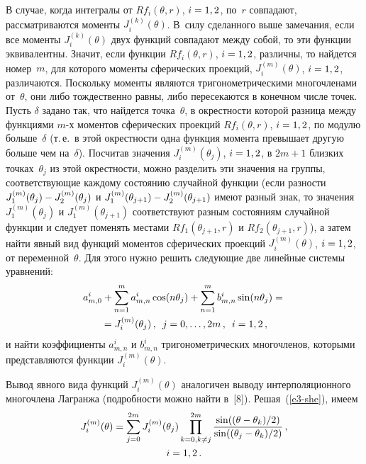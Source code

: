 \begin{multicols}{2}
В случае, когда интегралы от $Rf_{i}(\theta,r)$, $i\hm=1,2$, по~$r$
совпадают, рассматриваются моменты $J^{(k)}_i(\theta)$. В~силу
сделанного выше замечания, если все моменты $J^{(k)}_i(\theta)$ двух
функций совпадают между собой, то эти функции эквивалентны. Значит,
если функции $Rf_{i}(\theta,r)$, $i\hm=1,2$, различны, то найдется
номер~$m$, для которого моменты сферических проекций,
$J^{(m)}_{i}(\theta)$, $i\hm=1,2$, различаются. Поскольку моменты
являются тригонометрическими многочленами от~$\theta$, они либо
тождественно равны, либо пересекаются в конечном числе точек. Пусть
$\delta$ задано так, что найдется точка~$\theta$, в окрестности
которой разница между функциями $m$-х моментов сферических проекций
$Rf_{i}(\theta,r)$, $i\hm=1,2$, по модулю больше~$\delta$ (т.\,е.\ в
этой окрестности одна функция момента превышает другую больше чем на~$\delta$). 
Посчитав значения $J^{(m)}_{i}(\theta_{j})$, $i\hm=1,2$, в
$2m+1$ близких точках~$\theta_{j}$ из этой окрестности, можно
разделить эти значения на группы, соответствующие каждому состоянию
случайной функции (если разности
$J^{(m)}_{1}(\theta_{j})\hm-J^{(m)}_{2}(\theta_{j})$ и
$J^{(m)}_{1}(\theta_{j+1})\hm-J^{(m)}_{2}(\theta_{j+1})$ имеют разный
знак, то значения $J^{(m)}_{1}(\theta_{j})$ и
$J^{(m)}_{1}(\theta_{j+1})$ соответствуют разным состояниям
случайной функции и следует поменять местами $Rf_1(\theta_{j+1},r)$
и $Rf_2(\theta_{j+1},r)$), а затем найти явный вид функций моментов
сферических проекций $J^{(m)}_{i}(\theta)$,  $i\hm=1,2$, от переменной~$\theta$. 
Для этого нужно решить следующие две линейные сис\-те\-мы уравнений:
\begin{multline}
a_{m,0}^i+\sum\limits_{n=1}^{m}a_{m,n}^{i}\cos(n\theta_{j})+
\sum\limits_{n=1}^{m}b_{m,n}^{i}\sin(n\theta_{j})={}\\
{}=J^{(m)}_{i}(\theta_{j})\,,\enskip
j=0,\ldots ,2m\,, \enskip  i=1,2\,,\label{e3-she}
\end{multline}
и найти коэффициенты
$a_{m,n}^{i}$ и $b_{m,n}^{i}$ тригоно\-мет\-ри\-че\-ских многочленов, 
которыми представляются функции $J^{(m)}_{i}(\theta)$.

Вывод явного вида функций $J^{(m)}_{i}(\theta)$ аналогичен выводу интерполяционного 
многочлена Лагранжа (подробности можно найти в~[8]).
Решая~(\ref{e3-she}), имеем
\begin{multline}
J^{(m)}_{i}(\theta)=\sum\limits_{j=0}^{2m}J^{(m)}_{i}(\theta_{j})\prod\limits_{k=0, k\neq
j}^{2m}\displaystyle\frac{\displaystyle \sin(({\theta-\theta_k})/2)\mathstrut}{\displaystyle \sin({(\theta_j-\theta_k)}/2)\mathstrut}\,,\\
 i=1,2\,.\label{e4-she}
 \end{multline}


\end{multicols}
